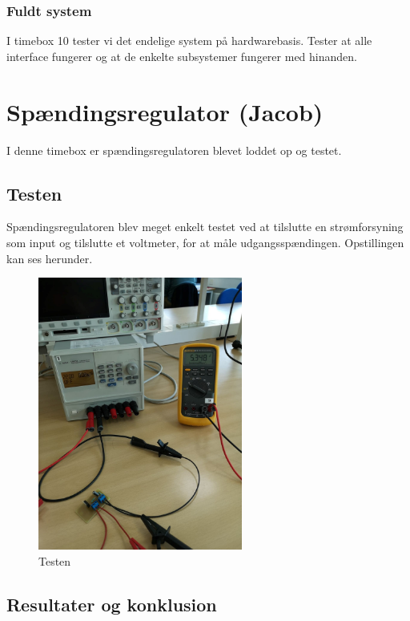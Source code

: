 \subsubsection{Fuldt system }
\label{sec:fuldt-system-}

I timebox 10 tester vi det endelige system på hardwarebasis. Tester at alle interface fungerer og at de enkelte subsystemer fungerer med hinanden. 
\clearpage
\section{Spændingsregulator (Jacob) }
\label{sec:spand-jacob-}

I denne timebox er spændingsregulatoren blevet loddet op og testet. 

\subsection{Testen }
\label{sec:testen-}

Spændingsregulatoren blev meget enkelt testet ved at tilslutte en strømforsyning som input og tilslutte et voltmeter, for at måle udgangsspændingen. Opstillingen kan ses herunder. 
\begin{figure}[h]
  \centering
  \includegraphics[width=0.6\textwidth]{jbil1.jpg}
  \caption{Testen}
  \label{fig:jbil1}
\end{figure}

\subsection{Resultater og konklusion }
\label{sec:result-og-konkl}

